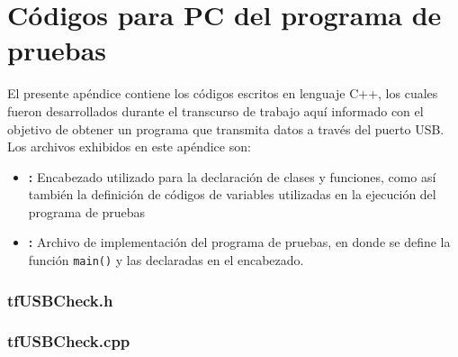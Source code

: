 \chapter{Códigos para PC del programa de pruebas}
	\label{ap:cpp}
	El presente apéndice contiene los códigos escritos en lenguaje C++, los cuales fueron desarrollados durante el transcurso de trabajo aquí informado con el objetivo de obtener un programa que transmita datos a través del puerto USB.
	Los archivos exhibidos en este apéndice son:
	
	\begin{itemize}
		\item \textbf{:} Encabezado utilizado para la declaración de clases y funciones, como así también la definición de códigos de variables utilizadas en la ejecución del programa de pruebas
		
		\item \textbf{:} Archivo de implementación del programa de pruebas, en donde se define la función \verb|main()| y las declaradas en el encabezado.
	\end{itemize}

	\subsection*{tfUSBCheck.h}
		\label{ap:cpp:head}
			
	\subsection*{tfUSBCheck.cpp}
		\label{ap:cpp:impl}
			